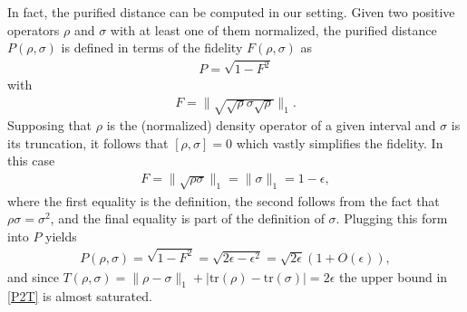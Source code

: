 \documentclass[12pt]{article}
\newcommand{\beq}{\begin{eqnarray}}
\newcommand{\eeq}{\end{eqnarray}}
\begin{document}
In fact, the purified distance can be computed in our setting. Given two positive operators $\rho$ and $\sigma$ with at least one of them normalized, the purified distance $P(\rho,\sigma)$ is defined in terms of the fidelity $F(\rho,\sigma)$ as
\beq
P = \sqrt{1-F^2}
\eeq
with
\beq
F = \| \sqrt{\sqrt{\rho}\sigma \sqrt{\rho}}\|_1.
\eeq
Supposing that $\rho$ is the (normalized) density operator of a given interval and $\sigma$ is its truncation, it follows that $[\rho,\sigma]=0$ which vastly simplifies the fidelity. In this case
\beq
F = \| \sqrt{\rho \sigma} \|_1 = \| \sigma \|_1 = 1-\epsilon,
\eeq
where the first equality is the definition, the second follows from the fact that $\rho \sigma = \sigma^2$, and the final equality is part of the definition of $\sigma$. Plugging this form into $P$ yields
\beq
P(\rho,\sigma) = \sqrt{1-F^2} = \sqrt{2 \epsilon - \epsilon^2} = \sqrt{2 \epsilon}(1+ O(\epsilon)),
\eeq
and since $T(\rho,\sigma) = \| \rho - \sigma \|_1 + |\text{tr}(\rho) - \text{tr}(\sigma)| = 2 \epsilon$ the upper bound in \eqref{P2T} is almost saturated.
\end{document}

